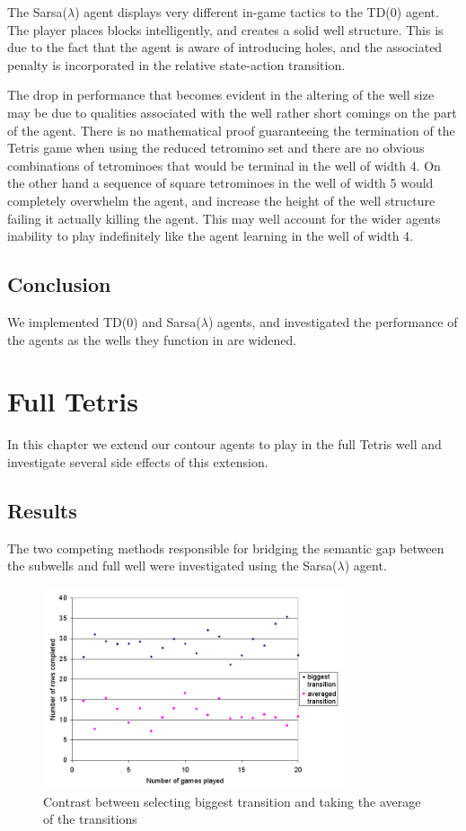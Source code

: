 \documentclass{rucsthesis}
\begin{document}
The Sarsa($\lambda$) agent displays very different in-game tactics to the TD(0) agent. The player places blocks intelligently, and creates a solid well structure. This is due to the fact that the agent is aware of introducing holes, and the associated penalty is incorporated in the relative state-action transition.

The drop in performance that becomes evident in the altering of the well size may be due to qualities associated with the well rather short comings on the part of the agent. There is no mathematical proof guaranteeing the termination of the Tetris game when using the reduced tetromino set and there are no obvious combinations of tetrominoes that would be terminal in the well of width 4. On the other hand a sequence of square tetrominoes in the well of width 5 would completely overwhelm the agent, and increase the height of the well structure failing it actually killing the agent. This may well account for the wider agents inability to play indefinitely like the agent learning in the well of width 4.

\section{Conclusion}

We implemented TD(0) and Sarsa($\lambda$) agents, and investigated the performance of the agents as the wells they function in are widened. 

\chapter{Full Tetris}

In this chapter we extend our contour agents to play in the full Tetris well and investigate several side effects of this extension.

\section{Results}

The two competing methods responsible for bridging the semantic gap between the subwells and full well were investigated using the Sarsa($\lambda$) agent.

\begin{figure}[h]
\centering
\includegraphics[width=3.5in]{multisingle.png}
\caption{Contrast between selecting biggest transition and taking the average of the transitions}
\label{fig:multisingle}
\end{figure}
\end{document}
